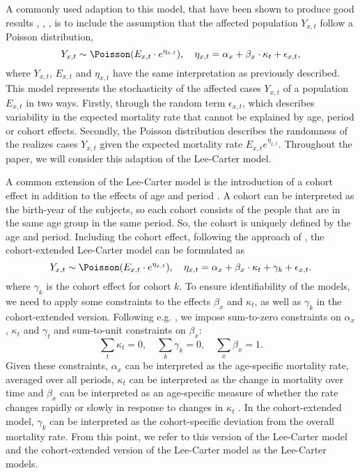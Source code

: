 \newpar A commonly used adaption to this model, that have been shown to produce good results \parencite{CZADO2005260}, \parencite{Wisniowski2015}, \parencite{BROUHNS2002373}, is to include the assumption that the affected population $Y_{x,t}$ follow a Poisson distribution,
\begin{equation}
Y_{x,t} \sim \Poisson(E_{x,t}\cdot e^{\eta_{x,t}}), \quad \eta_{x,t}= \alpha_x + \beta_x\cdot\kappa_t + \epsilon_{x,t},
\label{eq:LC-model}
\end{equation}
where $Y_{x,t}$, $E_{x,t}$ and $\eta_{x,t}$ have the same interpretation as previously described. This model represents the stochasticity of the affected cases $Y_{x,t}$ of a population $E_{x,t}$ in two ways. Firstly, through the random term $\epsilon_{x,t}$, which describes variability in the expected mortality rate that cannot be explained by age, period or cohort effects. Secondly, the Poisson distribution describes the randomness of the realizes cases $Y_{x,t}$ given the expected mortality rate $E_{x,t}e^{\eta_{x,t}}$. Throughout the paper, we will consider this adaption of the Lee-Carter model. 

\newpar A common extension of the Lee-Carter model is the introduction of a cohort effect in addition to the effects of age and period \parencite{Wisniowski2015}. A cohort can be interpreted as the birth-year of the subjects, so each cohort consists of the people that are in the same age group in the same period. So, the cohort is uniquely defined by the age and period. Including the cohort effect, following the approach of \textcite{Wisniowski2015}, the cohort-extended Lee-Carter model can be formulated as
\begin{equation}
    Y_{x,t} \sim \Poisson(E_{x,t}\cdot e^{\eta_{x,t}}), \quad \eta_{x,t} = \alpha_x + \beta_x \cdot \kappa_t + \gamma_k + \epsilon_{x,t}.
    \label{eq:LCC-model-orig}
\end{equation}
where $\gamma_k$ is the cohort effect for cohort $k$. 
To ensure identifiability of the models, we need to apply some constraints to the effects $\beta_x$ and $\kappa_t$, as well as $\gamma_k$ in the cohort-extended version. Following e.g. \textcite{LeeCarter1992}, we impose sum-to-zero constraints on $\alpha_x$, $\kappa_t$ and $\gamma_t$ and sum-to-unit constraints on $\beta_x$:
\begin{equation}
    \sum_t\kappa_t = 0,\quad \sum_k\gamma_k = 0, \quad \sum_x\beta_x = 1.
    \label{eq:LC-constraints}    
\end{equation}
Given these constraints, $\alpha_x$ can be interpreted as the age-specific mortality rate, averaged over all periods, $\kappa_t$ can be interpreted as the change in mortality over time and $\beta_x$ can be interpreted as an age-specific measure of whether the rate changes rapidly or slowly in response to changes in $\kappa_t$ \parencite{LeeCarter1992}. In the cohort-extended model, $\gamma_k$ can be interpreted as the cohort-specific deviation from the overall mortality rate. From this point, we refer to this version of the Lee-Carter model and the cohort-extended version of the Lee-Carter model as the Lee-Carter models. 

